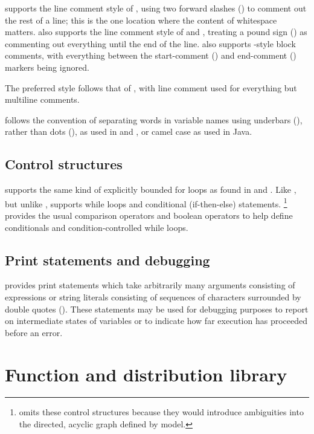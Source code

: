 \documentclass[article]{jss}
\begin{document}
 supports the line comment style of ,
using two forward slashes (\code{//}) to comment out the rest of a
line; this is the one location where the content of whitespace
matters.   also supports the line comment style of  and
, treating a pound sign (\code{\#}) as commenting out
everything until the end of the line.   also supports
-style block comments, with everything between the
start-comment (\code{/*}) and end-comment (\code{*/}) markers being
ignored. 

The preferred style follows that of , with line comment
used for everything but multiline comments.  

 follows the  convention of separating words in
variable names using underbars (\code{\_}), rather than dots
(), as used in  and , or camel case
as used in Java.

\subsection{Control structures}

 supports the same kind of explicitly bounded for loops
as found in  and .  Like , but unlike
,  supports while loops and conditional
(if-then-else) statements.%
%
\footnote{ omits these control structures because they
  would introduce ambiguities into the directed, acyclic graph defined
  by model.}
%
 provides the usual comparison operators and boolean
operators to help define conditionals and condition-controlled while
loops.  

\subsection{Print statements and debugging}

 provides print statements which take arbitrarily many
arguments consisting of expressions or string literals consisting of
sequences of characters surrounded by double quotes ().
These statements may be used for debugging purposes to report on
intermediate states of variables or to indicate how far execution has
proceeded before an error.

\section{Function and distribution library}
\end{document}
